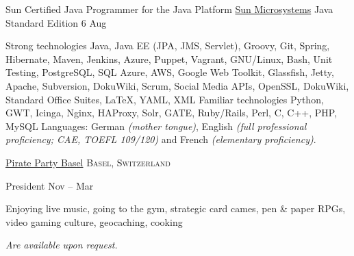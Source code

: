 \documentclass[10pt,a4paper]{article}
\begin{document}
\headedsection
  {Sun Certified Java Programmer for the Java Platform}
  {\href{http://education.oracle.com/}{Sun Microsystems}} {%
  \headedsubsection
    {Java Standard Edition 6}
    {Aug }
    {}
}

\spacedhrule{0.8em}{-0.4em}


\inlineheadsection  %
  {Strong technologies}
  {Java, Java EE (JPA, JMS, Servlet), Groovy, Git, Spring, Hibernate, Maven, Jenkins, Azure, Puppet, Vagrant, GNU/Linux, Bash, Unit Testing, PostgreSQL, SQL Azure, AWS, Google Web Toolkit, Glassfish, Jetty, Apache, Subversion, DokuWiki, Scrum, Social Media APIs, OpenSSL, DokuWiki, Standard Office Suites, LaTeX, YAML, XML}
\vspace{0.5em}
\inlineheadsection
  {Familiar technologies}
  {Python, GWT, Icinga, Nginx, HAProxy, Solr, GATE, Ruby/Rails, Perl, C, C++, PHP, MySQL }
\vspace{0.5em}
\inlineheadsection
  {Languages:}
  {German \emph{(mother tongue)}, English \emph{(full professional proficiency; CAE, TOEFL 109/120)} and French \emph{(elementary proficiency)}.}

\spacedhrule{1.9em}{-0.4em}


\headedsection  %
  {\href{http://www.piraten-basel.ch/}{Pirate Party Basel}}
  {\textsc{Basel, Switzerland}} {%

  \headedsubsection  %
    {President}
    {Nov  -- Mar }
    {}
}

\spacedhrule{1.1em}{-0.4em}


Enjoying live music, going to the gym, strategic card cames, pen \& paper RPGs, video gaming culture, geocaching, cooking

\spacedhrule{1.8em}{-0.4em}

\emph{Are available upon request.}
\end{document}
